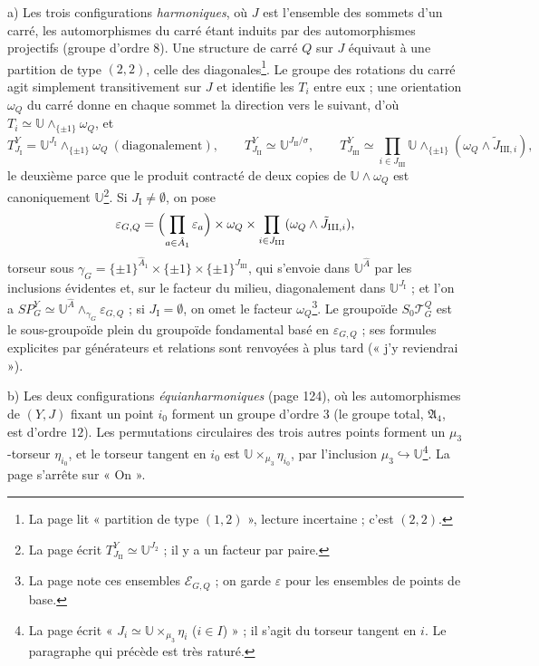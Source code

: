 \documentclass[11pt,a4paper]{article}
\begin{document}
a) Les trois configurations \emph{harmoniques}, où $J$ est l'ensemble des
sommets d'un carré, les automorphismes du carré étant induits par des
automorphismes projectifs (groupe d'ordre $8$). Une structure de carré $Q$ sur
$J$ équivaut à une partition de type $(2,2)$, celle des diagonales\footnote{La
page lit « partition de type $(1,2)$ », lecture incertaine ; c'est $(2,2)$.}.
Le groupe des rotations du carré agit simplement transitivement sur $J$ et
identifie les $T_i$ entre eux ; une orientation $\omega_Q$ du carré donne en
chaque sommet la direction vers le suivant, d'où $T_i \simeq \mathbb{U}
\wedge_{\{\pm1\}} \omega_Q$, et
\[
T^Y_{J_{\mathrm{I}}} = \mathbb{U}^{J_{\mathrm{I}}} \wedge_{\{\pm1\}} \omega_Q
\ (\text{diagonalement}), \qquad T^Y_{J_{\mathrm{II}}} \simeq
\mathbb{U}^{J_{\mathrm{II}}/\sigma}, \qquad T^Y_{J_{\mathrm{III}}} \simeq
\prod_{i \in J_{\mathrm{III}}} \mathbb{U} \wedge_{\{\pm1\}} (\omega_Q \wedge
\tilde J_{\mathrm{III},i}),
\]
le deuxième parce que le produit contracté de deux copies de $\mathbb{U}
\wedge \omega_Q$ est canoniquement $\mathbb{U}$\footnote{La page écrit
$T^Y_{J_{\mathrm{II}}} \simeq \mathbb{U}^{J_2}$ ; il y a un facteur par paire.}.
Si $J_{\mathrm{I}} \neq \emptyset$, on pose
\[
\varepsilon_{G,Q} = \Bigl(\prod_{a \in \hat A_1} \varepsilon_a\Bigr) \times
\omega_Q \times \prod_{i \in J_{\mathrm{III}}} (\omega_Q \wedge \tilde
J_{\mathrm{III},i}),
\]
torseur sous $\gamma_G = \{\pm1\}^{\hat A_1} \times \{\pm1\} \times
\{\pm1\}^{J_{\mathrm{III}}}$, qui s'envoie dans $\mathbb{U}^{\hat A}$ par les
inclusions évidentes et, sur le facteur du milieu, diagonalement dans
$\mathbb{U}^{J_{\mathrm{I}}}$ ; et l'on a $SP^Y_G \simeq \mathbb{U}^{\hat A}
\wedge_{\gamma_G} \varepsilon_{G,Q}$ ; si $J_{\mathrm{I}} = \emptyset$, on omet
le facteur $\omega_Q$\footnote{La page note ces ensembles $\mathcal{E}_{G,Q}$ ;
on garde $\varepsilon$ pour les ensembles de points de base.}. Le groupoïde
$S_0\mathcal{T}^Q_G$ est le sous-groupoïde plein du groupoïde fondamental basé
en $\varepsilon_{G,Q}$ ; ses formules explicites par générateurs et relations
sont renvoyées à plus tard (« j'y reviendrai »).

b) Les deux configurations \emph{équianharmoniques} (page 124), où les
automorphismes de $(Y, J)$ fixant un point $i_0$ forment un groupe d'ordre $3$
(le groupe total, $\mathfrak{A}_4$, est d'ordre $12$). Les permutations
circulaires des trois autres points forment un $\mu_3$-torseur $\eta_{i_0}$, et
le torseur tangent en $i_0$ est $\mathbb{U} \times_{\mu_3} \eta_{i_0}$, par
l'inclusion $\mu_3 \hookrightarrow \mathbb{U}$\footnote{La page écrit « $J_i
\simeq \mathbb{U} \times_{\mu_3} \eta_i$ ($i \in I$) » ; il s'agit du torseur
tangent en $i$. Le paragraphe qui précède est très raturé.}. La page s'arrête
sur « On ».
\end{document}
